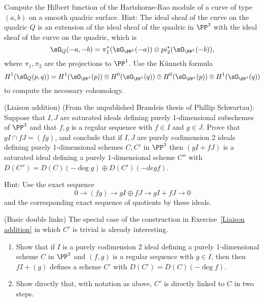 \begin{exercise}
 Compute the Hilbert function of the Hartshorne-Rao module of a curve of type $(a,b)$ on a smooth quadric surface.
 Hint: The ideal sheaf of the curve on the quadric $Q$ is an extension of the ideal sheaf of the quadric in $\PP^3$
 with the ideal sheaf of the curve on the quadric, which is 
 $$
 \sO_Q(-a,-b) = \pi_1^*(\sO_{\PP^1}(-a)) \otimes pi_2^*(\sO_{\PP^1}(-b)),
 $$
 where $\pi_1, \pi_2$ are the projections to $\PP^1$. Use the K\"unneth formula
 $$
 H^1(\sO_Q(p,q)) = H^1(\sO_{\PP^1}(p)) \otimes H^0(\sO_{\PP^1}(q)) \oplus
  H^0(\sO_{\PP^1}(p)) \otimes H^1(\sO_{\PP^1}(q))
 $$
  to compute the necessary cohomology.
\end{exercise}

\begin{exercise} (Liaison addition)\label{Liaison addition}
(From the unpublished Brandeis thesis of Phillip Schwartau):
Suppose that $I, J$ are saturated ideals defining purely 1-dimensional subschemes of $\PP^3$
and that $f,g$ is a regular sequence with $f\in I$ and $g\in J$.
Prove that $g I \cap fJ = (fg)$, and conclude that if $I,J$ are purely codimension 2 ideals
 defining purely 1-dimensional schemes $C,C'$ in $\PP^3$
 then  $(gI+fJ)$ is a saturated ideal defining a purely 1-dimensional
scheme $C''$ with $D(C'') = D(C)(-\deg g) \oplus D(C')(-deg f)$.

Hint: Use the exact sequence 
$$
0\to (fg) \to gI \oplus fJ \to gI+fJ \to 0
$$
and the corresponding exact sequence of quotients by these ideals.
\end{exercise}


\begin{exercise}(Basic double links)\label{Basic double links}
The special case of the construction in Exercise~\ref{Liaison addition} in which $C'$ is trivial is already interesting. 

\begin{enumerate}
 \item Show that if $I$ is a purely codimension 2 ideal
 defining a purely 1-dimensional scheme $C$ in $\PP^3$
 and $(f, g)$ is a regular sequence with $g\in I$, then
 then  $fI+(g)$ defines a scheme $C'$ with $D(C') = D(C)(-\deg f)$.

 \item Show directly that, with notation as above, $C'$ is directly linked to $C$
 in two steps. %
 \end{enumerate}

\end{exercise}

